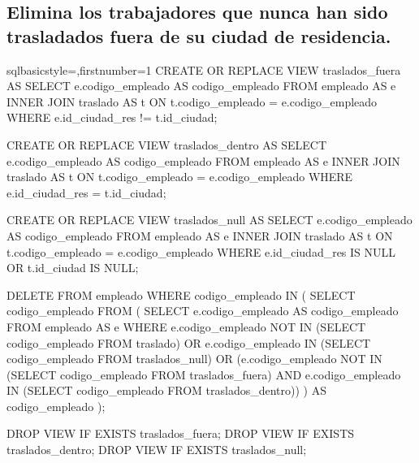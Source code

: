 	\subsection{Elimina los trabajadores que nunca han sido trasladados fuera de su ciudad de residencia.}
		\begin{sourcecodep}[]{sql}{basicstyle={\fontsize{10}{10}\selectfont\ttfamily},firstnumber=1}{}
			CREATE OR REPLACE VIEW traslados_fuera AS
				SELECT e.codigo_empleado AS codigo_empleado FROM empleado AS e
					INNER JOIN traslado AS t ON t.codigo_empleado = e.codigo_empleado
					WHERE e.id_ciudad_res != t.id_ciudad;
			
			CREATE OR REPLACE VIEW traslados_dentro AS
				SELECT e.codigo_empleado AS codigo_empleado FROM empleado AS e
					INNER JOIN traslado AS t ON t.codigo_empleado = e.codigo_empleado
					WHERE e.id_ciudad_res = t.id_ciudad;
			
			CREATE OR REPLACE VIEW traslados_null AS
				SELECT e.codigo_empleado AS codigo_empleado FROM empleado AS e
					INNER JOIN traslado AS t ON t.codigo_empleado = e.codigo_empleado
					WHERE e.id_ciudad_res IS NULL OR t.id_ciudad IS NULL;
			
			DELETE FROM empleado WHERE codigo_empleado IN (
				SELECT codigo_empleado FROM (
					SELECT e.codigo_empleado AS codigo_empleado FROM empleado AS e
						WHERE e.codigo_empleado NOT IN (SELECT codigo_empleado FROM traslado) OR
							e.codigo_empleado IN (SELECT codigo_empleado FROM traslados_null) OR
							(e.codigo_empleado NOT IN (SELECT codigo_empleado FROM traslados_fuera) AND
							e.codigo_empleado IN (SELECT codigo_empleado FROM traslados_dentro))
					) AS codigo_empleado
				);
			
			DROP VIEW IF EXISTS traslados_fuera;
			DROP VIEW IF EXISTS traslados_dentro;
			DROP VIEW IF EXISTS traslados_null;\end{sourcecodep}
